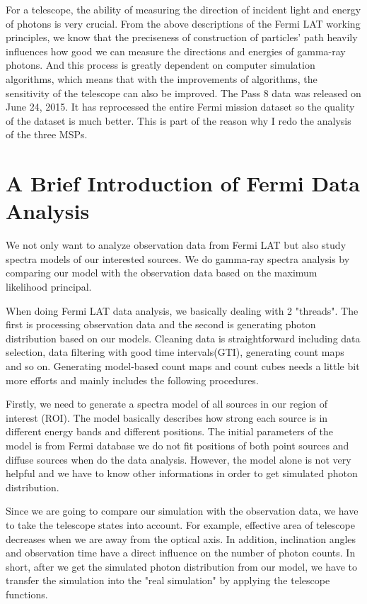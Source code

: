 \documentclass[12pt]{report}
\begin{document}
        For a telescope, the ability of measuring the direction of incident light and energy of photons is very crucial. 
        From the above descriptions of the Fermi LAT working principles, we know that the preciseness of 
        construction of particles' path heavily influences how good we can measure the directions and energies of 
        gamma-ray photons. 
        And this process is greatly dependent on computer simulation algorithms, which means that with the 
        improvements of algorithms,
        the sensitivity of the telescope can also be improved. The Pass 8 data was released on June 24, 2015.
        It has reprocessed the entire Fermi mission dataset so the quality of the dataset is much better. 
        This is part of the reason why I redo the analysis of the three MSPs.

        \section{A Brief Introduction of Fermi Data Analysis}
          We not only want to analyze observation data from Fermi LAT but also study spectra 
          models of our interested sources. We do gamma-ray spectra analysis by comparing our model with 
          the observation data based on the maximum likelihood principal. 

          When doing Fermi LAT data analysis, we basically dealing with 2 "threads". The first is 
          processing observation data and the second is generating photon distribution based on 
          our models. Cleaning data is straightforward including data selection, data filtering with 
          good time intervals(GTI), generating count maps and so on. Generating model-based count 
          maps and count cubes needs a little bit more efforts and mainly includes the following 
          procedures. 

          Firstly, we need to generate a spectra model of all sources in our region of interest (ROI).
          The model basically describes how strong each source is in different energy bands and 
          different positions. The initial parameters of the model is from Fermi database we do not fit 
          positions of both point sources and diffuse sources when do the data analysis. 
          However, the model alone is not very helpful and we have to know other 
          informations in order to get simulated photon distribution. 

          Since we are going to compare our simulation with the observation data, we have to 
          take the telescope states into account. For example, 
          effective area of telescope decreases when we are away from the optical axis. 
          In addition, inclination angles and observation time have a direct influence on the 
          number of photon counts. In short, after we get the simulated photon distribution from 
          our model, we have to transfer the simulation into the "real simulation" by applying 
          the telescope functions. 
          
\end{document}
